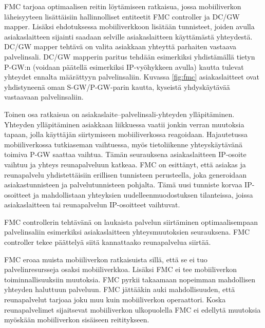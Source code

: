 FMC tarjoaa optimaalisen reitin löytämiseen ratkaisua, jossa mobiiliverkon läheisyyteen lisättäisiin hallinnolliset entiteetit FMC controller ja DC/GW mapper.
Lisäksi ehdotuksessa mobiiliverkkoon lisätään tunnisteet, joiden avulla asiakaslaitteen sijainti saadaan selville asiakaslaitteen käyttämästä yhteydestä.
DC/GW mapper tehtävä on valita asiakkaan yhteyttä parhaiten vastaava palvelinsali.
DC/GW mapperin paritus tehdään esimerkiksi yhdistämällä tietyn P-GW:n (voidaan päätellä esimerkiksi IP-vyöhykkeen avulla) kautta tulevat yhteydet ennalta määrättyyn palvelinsaliin. 
Kuvassa \ref{fig:fmc} asiakaslaitteet ovat yhdistyneenä oman S-GW/P-GW-parin kautta, kyseistä yhdyskäytävää vastaavaan palvelinsaliin. 

Toinen osa ratkaisua on asiakaslaite–palvelinsali-yhteyden ylläpitäminen.
Yhteyden ylläpitäminen asiakkaan liikkuessa vaatii jonkin verran muutoksia tapaan, jolla käyttäjän siirtymiseen mobiiliverkossa reagoidaan. 
Hajautetussa mobiiliverkossa tutkiaseman vaihtuessa, myös tietoliikenne yhteyskäytävänä toimiva P-GW saattaa vaihtua.
Tämän seurauksena asiakaslaitteen IP-osoite vaihtuu ja yhteys reunapalveluun katkeaa.
FMC on esittänyt, että asiakas ja reunapalvelu yhdistettäisiin erillisen tunnisteen perusteella, joka generoidaan asiakastunnisteen ja palvelutunnisteen pohjalta.
Tämä uusi tunniste korvaa IP-osoitteet ja mahdollistaan yhteyksien uudelleenmuodostuksen tilanteissa, joissa asiakaslaitteen tai reunapalvelun IP-osoitteet vaihtuvat.

FMC controllerin tehtävänä on laukaista palvelun siirtäminen optimaalisempaan palvelinsaliin esimerkiksi asiakaslaitteen yhteysmuutoksien seurauksena.
FMC controller tekee päättelyä siitä kannattaako reunapalvelua siirtää.

FMC eroaa muista mobiiliverkon ratkaisuista sillä, että se ei tuo palvelinresursseja osaksi mobiiliverkkoa. Lisäksi FMC ei tee mobiiliverkon toiminnallisuuksiin muutoksia. FMC pyrkii takaamaan nopeimman mahdollisen yhteyden haluttuun palveluun. FMC jättääkin auki mahdollisuuden, että reunapalvelut tarjoaa joku muu kuin mobiiliverkon operaattori.
Koska reunapalvelimet sijaitsevat mobiiliverkon ulkopuolella FMC ei edellytä muutoksia myöskään mobiiliverkon sisäiseen reititykseen.
